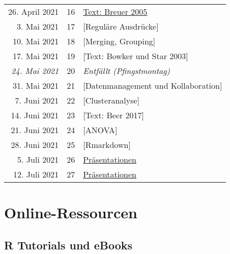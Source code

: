 \documentclass[
  ngerman,
]{article}
\begin{document}
\begin{longtable}[]{@{}rrl@{}}
26. April 2021 & 16 & \protect\hyperlink{text-breuer-2005}{Text: Breuer 2005} \\
3. Mai 2021 & 17 & {[}Reguläre Ausdrücke{]} \\
10. Mai 2021 & 18 & {[}Merging, Grouping{]} \\
17. Mai 2021 & 19 & {[}Text: Bowker und Star 2003{]} \\
\emph{24. Mai 2021} & 20 & \emph{Entfällt (Pfingstmontag)} \\
31. Mai 2021 & 21 & {[}Datenmanagement und Kollaboration{]} \\
7. Juni 2021 & 22 & {[}Clusteranalyse{]} \\
14. Juni 2021 & 23 & {[}Text: Beer 2017{]} \\
21. Juni 2021 & 24 & {[}ANOVA{]} \\
28. Juni 2021 & 25 & {[}Rmarkdown{]} \\
5. Juli 2021 & 26 & \protect\hyperlink{pruxe4sentationen}{Präsentationen} \\
12. Juli 2021 & 27 & \protect\hyperlink{pruxe4sentationen}{Präsentationen} \\
\bottomrule
\end{longtable}

\hypertarget{online-ressourcen}{%
\section*{Online-Ressourcen}\label{online-ressourcen}}

\hypertarget{r-tutorials-und-ebooks}{%
\subsection*{R Tutorials und eBooks}\label{r-tutorials-und-ebooks}}
\end{document}
